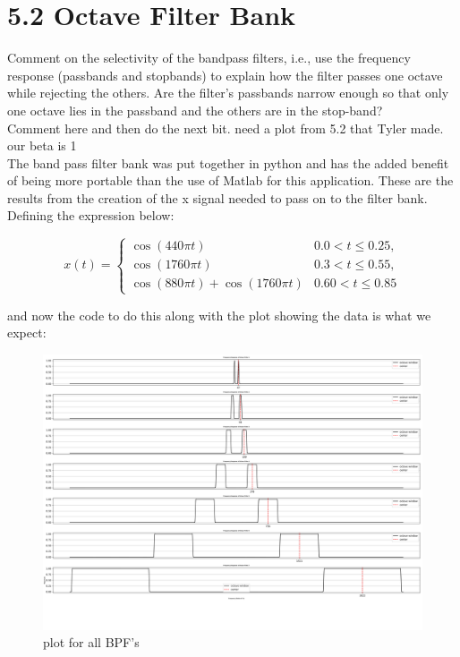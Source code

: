 \documentclass[a4paper, 11pt]{exam}
\begin{document}
\section*{5.2 Octave Filter Bank}
 Comment on the selectivity of the bandpass filters, i.e., use the frequency response (passbands and stopbands) to explain how the filter passes one octave while rejecting the others. Are the filter’s passbands narrow enough so that only one octave lies in the passband and the others are in
 the stop-band?
\\ Comment here and then do the next bit. need a plot from 5.2 that Tyler made. our beta is 1\\
The band pass filter bank was put together in python and has the added benefit of being more portable than the use of Matlab for this application. These are the results from the creation of the x signal needed to pass on to the filter bank. Defining the expression below:
\begin{center}
  \[
    x(t) =
    \begin{cases}
      \cos{(440\pi t)} & 0.0 < t \le 0.25 , \\
      \cos{(1760\pi t)} & 0.3 < t \le 0.55 , \\
      \cos{(880\pi t)} + \cos{(1760\pi t)} & 0.60 < t \le 0.85
    \end{cases}
    \]
\end{center}
\newpage
and now the code to do this along with the plot showing the data is what we expect:\\  
\begin{figure}[h!]
  \centering
  \hspace*{-1.5cm}\includegraphics[width=18cm]{../freq_data.png}
  \caption{plot for all BPF's}
  \label{fig:bandpass}
\end{figure}
\end{document}
